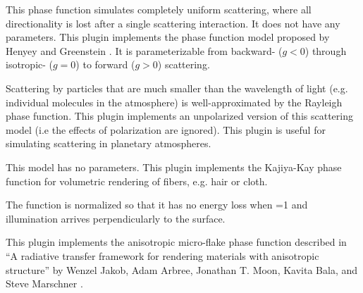 

This phase function simulates completely uniform scattering,
where all directionality is lost after a single scattering
interaction. It does not have any parameters.
This plugin implements the phase function model proposed by
Henyey and Greenstein \cite{Henyey1941Diffuse}. It is
parameterizable from backward- ($g<0$) through
isotropic- ($g=0$) to forward ($g>0$) scattering.

Scattering by particles that are much smaller than the wavelength
of light (e.g. individual molecules in the atmosphere) is well-approximated
by the Rayleigh phase function. This plugin implements an unpolarized
version of this scattering model (i.e the effects of polarization are ignored).
This plugin is useful for simulating scattering in planetary atmospheres.

This model has no parameters.
This plugin implements the Kajiya-Kay \cite{Kajiya1989Rendering}
phase function for volumetric rendering of fibers, e.g.
hair or cloth.

The function is normalized so that it has no energy loss when
=1 and illumination arrives perpendicularly to the surface.


This plugin implements the anisotropic micro-flake phase function
described in
``A radiative transfer framework for rendering materials with
anisotropic structure'' by Wenzel Jakob, Adam Arbree,
Jonathan T. Moon, Kavita Bala, and Steve Marschner
\cite{Jakob2010Radiative}.


